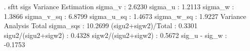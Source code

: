 . sftt sigs
{\smallskip}
               Variance Estimation          
sigma_v    :       2.6230
sigma_u    :       1.2113
sigma_w    :       1.3866
sigma_v_sq :       6.8799
sigma_u_sq :       1.4673
sigma_w_sq :       1.9227
               Variance Analysis          
Total sigma_sqs     :  10.2699
(sigu2+sigw2)/Total :  0.3301
sigu2/(sigu2+sigw2) :  0.4328
sigw2/(sigu2+sigw2) :  0.5672
sig_u - sig_w       : -0.1753
